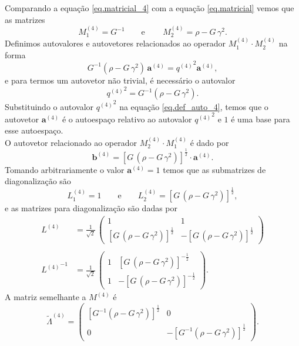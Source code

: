 Comparando a equa\c{c}\~ao \ref{eq.matricial_4} com a equa\c{c}\~ao \ref{eq.matricial} vemos que as matrizes
\begin{equation*}
M^{(4)}_1=G^{-1}\qquad\text{e}\qquad\,M^{(4)}_2=\rho-G\,\gamma^2.
\end{equation*}
Definimos autovalores e autovetores relacionados ao operador $M^{(4)}_1\cdot M^{(4)}_2$ na forma
\begin{equation}\label{eq.def_auto_4}
G^{-1}(\rho-G\,\gamma^2)\,\mathbf{a}^{(4)}={q^{(4)}}^2\mathbf{a}^{(4)},
\end{equation}
e para termos um autovetor n\~ao trivial, \'e necess\'ario o autovalor
\begin{equation*}
{q^{(4)}}^2=G^{-1}(\rho-G\,\gamma^2).
\end{equation*}
Substituindo o autovalor ${q^{(4)}}^2$ na equa\c{c}\~ao \ref{eq.def_auto_4}, temos que o autovetor $\mathbf{a}^{(4)}$ \'e o autoespa\c{c}o relativo ao autovalor ${q^{(4)}}^2$ e ${1}$ \'e uma base para esse autoespa\c{c}o.\\
O autovetor relacionado ao operador $M^{(4)}_2\cdot M^{(4)}_1$ \'e dado por
\begin{equation*}
\mathbf{b}^{(4)}=[G\,(\rho-G\,\gamma^2)]^{\frac{1}{2}}   \cdot\mathbf{a}^{(4)}.
\end{equation*}
Tomando arbitrariamente o valor $\mathbf{a}^{(4)}=1$ temos que as submatrizes de diagonaliza\c{c}\~ao s\~ao
\begin{equation*}
L^{(4)}_1=1\qquad\text{e}\qquad L^{(4)}_2=[G\,(\rho-G\,\gamma^2)]^{\frac{1}{2}},
\end{equation*}
e as matrizes para diagonaliza\c{c}\~ao s\~ao dadas por
\begin{align*}
L^{(4)}&=\frac{1}{\sqrt{2}}\,
\begin{pmatrix}
1&1\\
[G\,(\rho-G\,\gamma^2)]^{\frac{1}{2}}&-[G\,(\rho-G\,\gamma^2)]^{\frac{1}{2}}
\end{pmatrix}\\\\
{L^{(4)}}^{-1}&=\frac{1}{\sqrt{2}}\,
\begin{pmatrix}
1&[G\,(\rho-G\,\gamma^2)]^{-\frac{1}{2}}\\
1&-[G\,(\rho-G\,\gamma^2)]^{-\frac{1}{2}}
\end{pmatrix}.
\end{align*}
A matriz semelhante a $M^{(4)}$ \'e
\begin{equation*}
\tilde{\Lambda}^{(4)}=
\begin{pmatrix}
[G^{-1}(\rho-G\,\gamma^2)]^{\frac{1}{2}}&0\\
0&-[G^{-1}(\rho-G\,\gamma^2)]^{\frac{1}{2}}
\end{pmatrix}.
\end{equation*}





